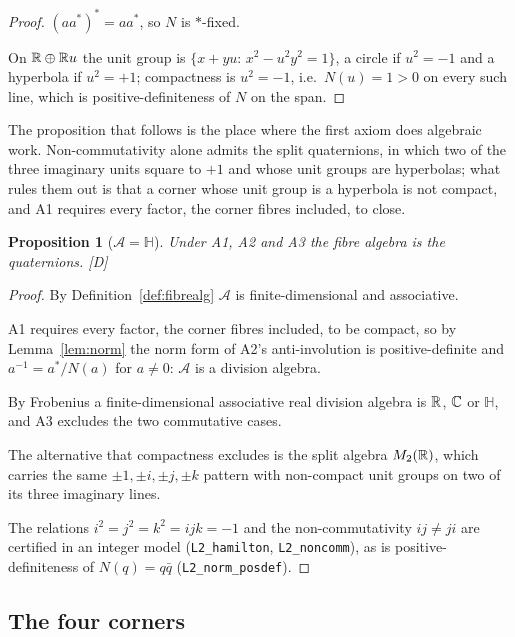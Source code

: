 \documentclass[11pt,a4paper]{article}
\theoremstyle{plain}
\newtheorem{proposition}[theorem]{Proposition}
\theoremstyle{definition}
\theoremstyle{remark}
\newcommand{\Hquat}{\mathbb{H}}
\newcommand{\rigD}{[\textup{D}]}
\begin{document}
\begin{proof}
$(aa^{*})^{*}=aa^{*}$, so $N$ is $*$-fixed.

On $\mathbb{R}\oplus\mathbb{R} u$ the unit group is $\{x+yu:\,x^{2}-u^{2}y^{2}=1\}$, a circle if $u^{2}=-1$ and a hyperbola if $u^{2}=+1$; compactness is $u^{2}=-1$, i.e.\ $N(u)=1>0$ on every such line, which is positive-definiteness of $N$ on the span.
\end{proof}

The proposition that follows is the place where the first axiom does algebraic work. Non-commutativity alone admits the split quaternions, in which two of the three imaginary units square to $+1$ and whose unit groups are hyperbolas; what rules them out is that a corner whose unit group is a hyperbola is not compact, and A1 requires every factor, the corner fibres included, to close.

\begin{proposition}[$\mathcal{A}=\Hquat$]\label{prop:H}
Under A1, A2 and A3 the fibre algebra is the quaternions. \rigD
\end{proposition}

\begin{proof}
By Definition~\ref{def:fibrealg} $\mathcal{A}$ is finite-dimensional and associative.

A1 requires every factor, the corner fibres included, to be compact, so by Lemma~\ref{lem:norm} the norm form of A2's anti-involution is positive-definite and $a^{-1}=a^{*}/N(a)$ for $a\neq0$: $\mathcal{A}$ is a division algebra.

By Frobenius \cite{Frobenius1878} a finite-dimensional associative real division algebra is $\mathbb{R}$, $\mathbb{C}$ or $\Hquat$, and A3 excludes the two commutative cases.

The alternative that compactness excludes is the split algebra $M_{2}(\mathbb{R})$, which carries the same $\pm1,\pm i,\pm j,\pm k$ pattern with non-compact unit groups on two of its three imaginary lines.

The relations $i^{2}=j^{2}=k^{2}=ijk=-1$ and the non-commutativity $ij\neq ji$ are certified in an integer model (\texttt{L2\_hamilton}, \texttt{L2\_noncomm}), as is positive-definiteness of $N(q)=q\bar q$ (\texttt{L2\_norm\_posdef}).
\end{proof}

\subsection{The four corners}
\end{document}

